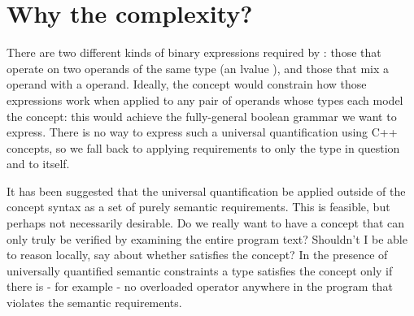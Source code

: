 \section{Why the complexity?}
There are two different kinds of binary expressions required by : those that
operate on two operands of the same type (an lvalue ), and those that mix a 
operand with a  operand. Ideally, the concept would constrain how those expressions
work when applied to any pair of operands whose types each model the concept: this would achieve the
fully-general boolean grammar we want to express. There is no way to express such a universal
quantification using C++ concepts, so we fall back to applying requirements to only the type in
question and to  itself.

It has been suggested that the universal quantification be applied outside of the concept syntax as
a set of purely semantic requirements. This is feasible, but perhaps not necessarily desirable. Do
we really want to have a concept that can only truly be verified by examining the entire program
text? Shouldn't I be able to reason locally, say about whether  satisfies the
 concept? In the presence of universally quantified semantic constraints a type
satisfies the concept only if there is - for example - no overloaded operator anywhere in the
program that violates the semantic requirements.

